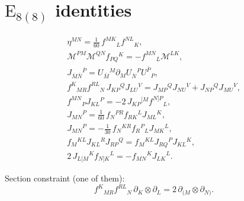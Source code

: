 \documentclass[11pt]{article}
\newcommand{\M}{\ensuremath{\mathcal{M}}\xspace}
\newcommand{\E}{\ensuremath{\mathrm{E}}\xspace}
\begin{document}
\section{\texorpdfstring{$\E_{8(8)}$}{E8(8)} identities}

\begin{gather}
  \eta^{MN} = \frac{1}{60}\,f^{MK}{}_{L}f^{NL}{}_{K}, \\
  \M^{PM}\M^{QN}f_{PQ}{}^{K} = - f^{MN}{}_{L}\M^{LK}, \\
  J_{\bar M\bar N}{}^{\bar P} = U_{\bar M}{}^{M}\partial_{M}U_{\bar N}{}^{P}U^{\bar P}{}_{P}, \\
  f^{K}{}_{MR}f^{RL}{}_{N}\,J_{KP}{}^{Q}J_{LU}{}^{V} = J_{MP}{}^{Q}J_{NU}{}^{V}+J_{NP}{}^{Q}J_{MU}{}^{V},\\
  f^{MN}{}_{P}J_{KL}{}^{P} = -2\,J_{KP}{}^{[M}f^{N]P}{}_{L}, \\
  J_{MN}{}^{P} = \frac{1}{60} \,f_{N}{}^{PR}f_{RK}{}^{L}J_{ML}{}^{K}, \\
  J_{MN}{}^{P} = -\frac{1}{30} \,f_{N}{}^{KR}f_{R}{}^{P}{}_{L}J_{MK}{}^{L},\\
  f_{M}{}^{KL}J_{KL}{}^{R}J_{RP}{}^{Q} = f_{M}{}^{KL}J_{RQ}{}^{P}J_{KL}{}^{K},\\
  2\,J_{L[M}{}^{K}f_{N]K}{}^{L} = -f_{MN}{}^{K}J_{LK}{}^{L}.
\end{gather}

Section constraint (one of them):
\begin{equation}
  f^{K}{}_{MR}f^{RL}{}_{N} \,\partial_{K}\otimes\partial_{L} = 2\,\partial_{(M}\otimes\partial_{N)}.
\end{equation}



\end{document}

